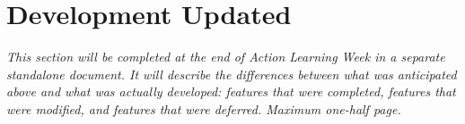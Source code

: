 \section{Development Updated}
\label{sec:results-updated}

\textit{This section will be completed at the end of Action Learning Week in a separate standalone document. It will describe the differences between what was anticipated above and what was actually developed: features that were completed, features that were modified, and features that were deferred. Maximum one-half page.}
